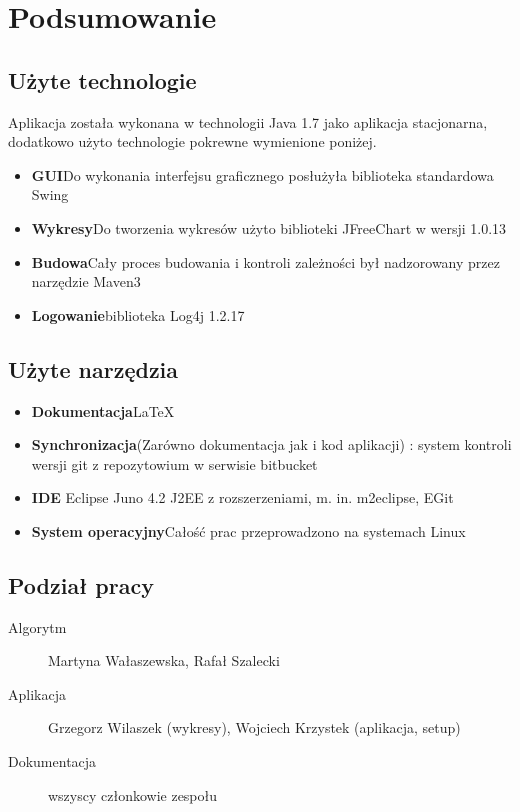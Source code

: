 \documentclass[a4paper,12pt,notitlepage]{mwrep}
\begin{document}
\chapter{Podsumowanie}
\section{Użyte technologie}
Aplikacja została wykonana w technologii Java 1.7
jako aplikacja stacjonarna,
dodatkowo użyto technologie pokrewne wymienione poniżej.
\begin{itemize}
	\item	\textbf{GUI}\quad Do wykonania interfejsu graficznego posłużyła biblioteka standardowa Swing
	\item	\textbf{Wykresy}\quad Do tworzenia wykresów użyto biblioteki JFreeChart w wersji 1.0.13
	\item	\textbf{Budowa}\quad Cały proces budowania i kontroli zależności był nadzorowany przez narzędzie
					Maven3
	\item	\textbf{Logowanie}\quad biblioteka Log4j 1.2.17
\end{itemize}

\section{Użyte narzędzia}
\begin{itemize}
	\item	\textbf{Dokumentacja}\quad \LaTeX
	\item	\textbf{Synchronizacja}\quad (Zarówno dokumentacja jak i kod aplikacji) : system kontroli wersji git
			z repozytowium w serwisie bitbucket
	\item	\textbf{IDE\quad} Eclipse Juno 4.2 J2EE z rozszerzeniami, m. in. m2eclipse, EGit
	\item	\textbf{System operacyjny}\quad Całość prac przeprowadzono na systemach Linux
\end{itemize}

\section{Podział pracy}
\begin{description}
	\item[Algorytm] Martyna Wałaszewska, Rafał Szalecki
	\item[Aplikacja] Grzegorz Wilaszek (wykresy), Wojciech Krzystek (aplikacja, setup)
	\item[Dokumentacja] wszyscy członkowie zespołu
\end{description}
\end{document}
